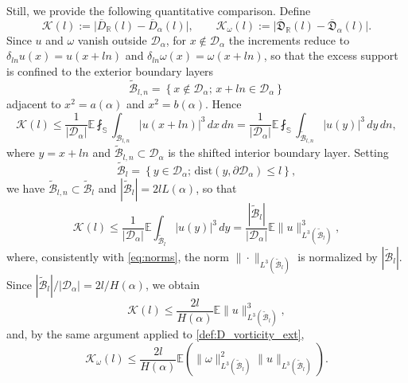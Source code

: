 \documentclass[11pt,a4paper]{article}
\numberwithin{equation}{section}
\numberwithin{theorem}{section}
\numberwithin{remark}{section}
\numberwithin{definition}{section}
\begin{document}
Still, we provide the following quantitative comparison. Define
\begin{equation}\label{def:K}
    \mathcal{K}(l) := \big|\overline{D}_{\mathbb{R}}(l) - \overline{D}_{\alpha}(l)\big|,
    \qquad
    \mathcal{K}_{\omega}(l) := \big|\overline{\mathfrak{D}}_{\mathbb{R}}(l) - \overline{\mathfrak{D}}_{\alpha}(l)\big|.
\end{equation}
Since $u$ and $\omega$ vanish outside $\mathcal{D}_\alpha$, for $x \notin
\mathcal{D}_\alpha$ the increments reduce to $\delta_{ln}u(x) = u(x+ln)$ and
$\delta_{ln}\omega(x) = \omega(x+ln)$, so that the excess support is confined
to the exterior boundary layers
\begin{equation}
    \widetilde{\mathcal{B}}_{l,n}=\left\{x\notin\mathcal{D}_\alpha;\, x+ln \in \mathcal{D}_\alpha\right\}
\end{equation}
adjacent to $x^2 = a(\alpha)$ and $x^2 = b(\alpha)$. Hence
\begin{equation}
    \mathcal{K}(l) \le \frac{1}{|\mathcal{D}_\alpha|}\mathbb{E} \fint_\mathbb{S}\int_{\mathcal{B}_{l,n}} |u(x+ln)|^3 \, dx\,dn = \frac{1}{|\mathcal{D}_\alpha|}\mathbb{E} \fint_\mathbb{S}\int_{\widetilde{\mathcal{B}}_{l,n}} |u(y)|^3 \, dy\,dn,
\end{equation}
where $y=x+ln$ and $\widetilde{\mathcal{B}}_{l,n} \subset \mathcal{D}_\alpha$
is the shifted interior boundary layer. Setting
\begin{equation}
    \widetilde{\mathcal{B}}_l=\left\{y\in \mathcal{D}_\alpha;\, \text{dist}(y,\partial \mathcal{D}_\alpha)\leq l\right\},
\end{equation}
we have $\widetilde{\mathcal{B}}_{l,n} \subset \widetilde{\mathcal{B}}_{l}$ and
$|\widetilde{\mathcal{B}}_{l}| = 2lL(\alpha)$, so that
\begin{equation}\label{eq:boundary_error_exact}
   \mathcal{K}(l)\le  \frac{1}{|\mathcal{D}_\alpha|}\mathbb{E} \int_{\widetilde{\mathcal{B}}_{l}} |u(y)|^3 \, dy =  \frac{|\widetilde{\mathcal{B}}_{l}|}{|\mathcal{D}_\alpha|}  \mathbb{E}\|u\|_{L^3(\widetilde{\mathcal{B}}_{l})}^3,
\end{equation}
where, consistently with \eqref{eq:norms}, the norm
$\|\cdot\|_{L^3(\widetilde{\mathcal{B}}_{l})}$ is normalized by
$|\widetilde{\mathcal{B}}_{l}|$. Since
$|\widetilde{\mathcal{B}}_{l}|/|\mathcal{D}_\alpha| = 2l/H(\alpha)$, we obtain
\begin{equation}\label{eq:error}
    \mathcal{K}(l) \leq   \frac{2l}{H(\alpha)} \mathbb{E}\|u\|_{L^3(\widetilde{\mathcal{B}}_{l})}^3,
\end{equation}
and, by the same argument applied to \eqref{def:D_vorticity_ext},
\begin{equation}\label{eq:error_vortc}
    \mathcal{K}_{\omega}(l) \leq   \frac{2l}{H(\alpha)} \mathbb{E}\left(\|\omega\|_{L^3(\widetilde{\mathcal{B}}_l)}^2\|u\|_{L^3(\widetilde{\mathcal{B}}_l)}\right).
\end{equation}
\end{document}
